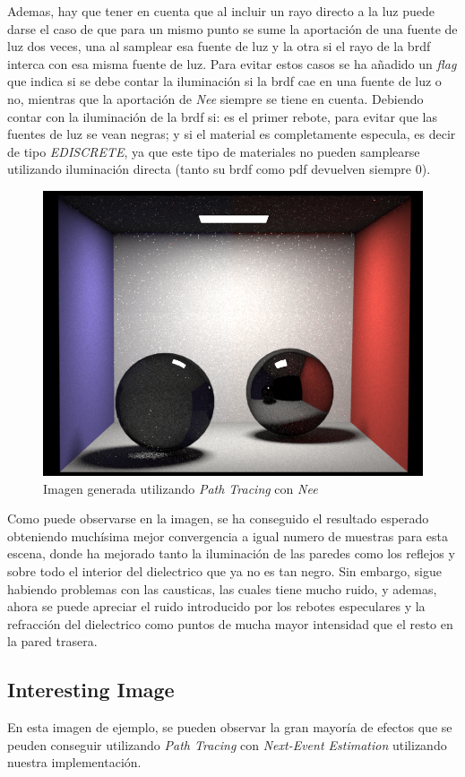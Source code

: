 \documentclass[10pt,oneside,a4paper]{article}
\begin{document}
Ademas, hay que tener en cuenta que al incluir un rayo directo a la luz puede darse el caso de que para un mismo punto se sume la aportación de una fuente de luz dos veces, una al samplear esa fuente de luz y la otra si el rayo de la brdf interca con esa misma fuente de luz. Para evitar estos casos se ha añadido un \textit{flag} que indica si se debe contar la iluminación si la brdf cae en una fuente de luz o no, mientras que la aportación de \textit{Nee} siempre se tiene en cuenta. Debiendo contar con la iluminación de la brdf si: es el primer rebote, para evitar que las fuentes de luz se vean negras; y si el material es completamente especula, es decir de tipo \textit{EDISCRETE}, ya que este tipo de materiales no pueden samplearse utilizando iluminación directa (tanto su brdf como pdf devuelven siempre 0).\\

\begin{figure}[h]
\centering
\includegraphics[width=.6\linewidth]{images/cbox_pathNee_512.png}
\caption{Imagen generada utilizando \textit{Path Tracing} con \textit{Nee}}
\label{fig:disp}
\end{figure}

Como puede observarse en la imagen, se ha conseguido el resultado esperado obteniendo muchísima mejor convergencia a igual numero de muestras para esta escena, donde ha mejorado tanto la iluminación de las paredes como los reflejos y sobre todo el interior del dielectrico que ya no es tan negro. Sin embargo, sigue habiendo problemas con las causticas, las cuales tiene mucho ruido, y ademas, ahora se puede apreciar el ruido introducido por los rebotes especulares y la refracción del dielectrico como puntos de mucha mayor intensidad que el resto en la pared trasera.
 
 \subsection{Interesting Image}
En esta imagen de ejemplo, se pueden observar la gran mayoría de efectos que se peuden conseguir utilizando \textit{ Path Tracing} con \textit{Next-Event Estimation} utilizando nuestra implementación.
\end{document}

